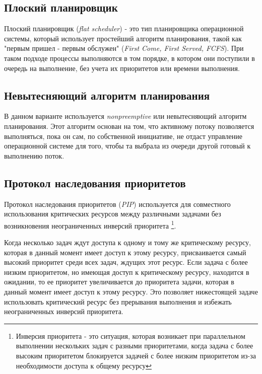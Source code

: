 \subsection{Плоский планировщик}
Плоский планировщик (\textit{flat scheduler}) - это тип планировщика операционной системы,
который использует простейший алгоритм планирования, такой как "первым пришел - первым обслужен"
(\textit{First Come, First Served, FCFS}).
При таком подходе процессы выполняются в том порядке, в котором они поступили в очередь на выполнение, 
без учета их приоритетов или времени выполнения.

\subsection{Невытесняющий алгоритм планирования}
В данном варианте используется \textit{nonpreemptive} или невытесняющий алгоритм планирования.
Этот алгоритм основан на том, что активному потоку позволяется выполняться, пока он сам,
по собственной инициативе, не отдаст управление операционной системе для того, чтобы та
выбрала из очереди другой готовый к выполнению поток.

\subsection{Протокол наследования приоритетов}
Протокол наследования приоритетов (\textit{PIP}) используется для совместного использования 
критических ресурсов между различными задачами без возникновения неограниченных инверсий приоритета
\footnote[1]{Инверсия приоритета - это ситуация, которая возникает при параллельном выполнении нескольких 
задач с разными приоритетами, когда задача с более высоким приоритетом блокируется задачей с более низким
 приоритетом из-за необходимости доступа к общему ресурсу}.

Когда несколько задач ждут доступа к одному и тому же критическому ресурсу, которая
в данный момент имеет доступ к этому ресурсу, присваивается самый высокий приоритет среди всех
задач, ждущих этот ресурс. Если задача с более низким приоритетом, но имеющая доступ к критическому
ресурсу, находится в ожидании, то ее приоритет увеличивается до приоритета задачи, которая в данный
момент имеет доступ к этому ресурсу. Это позволяет нижестоящей задаче использовать критический ресурс
без прерывания выполнения и избежать неограниченных инверсий приоритета.


